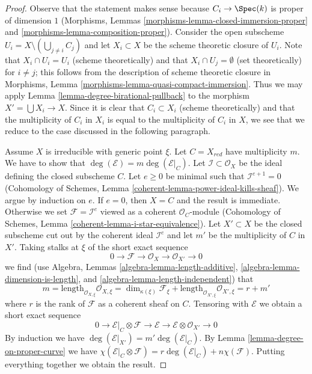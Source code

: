 \begin{proof}
Observe that the statement makes sense because $C_i \to \Spec(k)$
is proper of dimension $1$ (Morphisms, Lemmas
\ref{morphisms-lemma-closed-immersion-proper} and
\ref{morphisms-lemma-composition-proper}). Consider the open subscheme
$U_i = X \setminus (\bigcup_{j \not = i} C_j)$ and let $X_i \subset X$
be the scheme theoretic closure of $U_i$. Note that $X_i \cap U_i = U_i$
(scheme theoretically) and that $X_i \cap U_j = \emptyset$
(set theoretically) for $i \not = j$; this follows from the description
of scheme theoretic closure in
Morphisms, Lemma \ref{morphisms-lemma-quasi-compact-immersion}.
Thus we may apply Lemma \ref{lemma-degree-birational-pullback} to the morphism
$X' = \bigcup X_i \to X$. Since it is clear that $C_i \subset X_i$
(scheme theoretically) and that the multiplicity of $C_i$ in $X_i$ is equal
to the multiplicity of $C_i$ in $X$, we see that we reduce to the case
discussed in the following paragraph.

\medskip\noindent
Assume $X$ is irreducible with generic point $\xi$. Let
$C = X_{red}$ have multiplicity $m$.
We have to show that $\deg(\mathcal{E}) = m \deg(\mathcal{E}|_C)$.
Let $\mathcal{I} \subset \mathcal{O}_X$ be the ideal defining the closed
subscheme $C$. Let $e \geq 0$ be minimal such that $\mathcal{I}^{e + 1} = 0$
(Cohomology of Schemes, Lemma \ref{coherent-lemma-power-ideal-kills-sheaf}).
We argue by induction on $e$. If $e = 0$, then $X = C$ and the result
is immediate. Otherwise we set $\mathcal{F} = \mathcal{I}^e$ viewed as
a coherent $\mathcal{O}_C$-module (Cohomology of Schemes, Lemma
\ref{coherent-lemma-i-star-equivalence}).
Let $X' \subset X$ be the closed subscheme cut out by the
coherent ideal $\mathcal{I}^e$ and let $m'$ be the multiplicity
of $C$ in $X'$. Taking stalks at $\xi$ of the short exact sequence
$$
0 \to \mathcal{F} \to \mathcal{O}_X \to \mathcal{O}_{X'} \to 0
$$
we find (use Algebra, Lemmas \ref{algebra-lemma-length-additive},
\ref{algebra-lemma-dimension-is-length}, and
\ref{algebra-lemma-length-independent}) that
$$
m = \text{length}_{\mathcal{O}_{X, \xi}} \mathcal{O}_{X, \xi}
= \dim_{\kappa(\xi)} \mathcal{F}_\xi +
\text{length}_{\mathcal{O}_{X', \xi}} \mathcal{O}_{X', \xi}
= r + m'
$$
where $r$ is the rank of $\mathcal{F}$ as a coherent sheaf on $C$.
Tensoring with $\mathcal{E}$ we obtain a short exact sequence
$$
0 \to \mathcal{E}|_C \otimes \mathcal{F} \to \mathcal{E} \to
\mathcal{E} \otimes \mathcal{O}_{X'} \to 0
$$
By induction we have
$\deg(\mathcal{E}|_{X'}) = m' \deg(\mathcal{E}|_C)$.
By Lemma \ref{lemma-degree-on-proper-curve} we have
$\chi(\mathcal{E}|_C \otimes \mathcal{F}) =
r \deg(\mathcal{E}|_C) + n \chi(\mathcal{F})$.
Putting everything together we obtain the result.
\end{proof}

